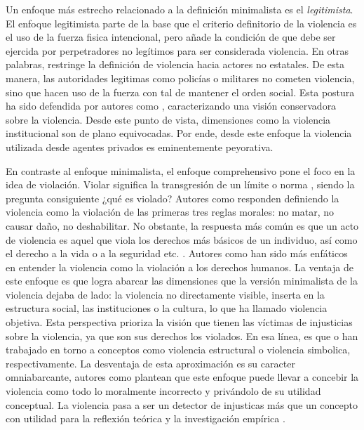 \documentclass[12pt,twoside]{templates/facsothesis}
\begin{document}
Un enfoque más estrecho relacionado a la definición minimalista es el \emph{legitimista}. El enfoque legitimista parte de la base que el criterio definitorio de la violencia es el uso de la fuerza fisica intencional, pero añade la condición de que debe ser ejercida por perpetradores no legítimos para ser considerada violencia. En otras palabras, restringe la definición de violencia hacia actores no estatales. De esta manera, las autoridades legitimas como policías o militares no cometen violencia, sino que hacen uso de la fuerza con tal de mantener el orden social. Esta postura ha sido defendida por autores como \citet{Hook1976}, caracterizando una visión conservadora sobre la violencia. Desde este punto de vista, dimensiones como la violencia institucional son de plano equivocadas. Por ende, desde este enfoque la violencia utilizada desde agentes privados es eminentemente peyorativa.

En contraste al enfoque minimalista, el enfoque comprehensivo pone el foco en la idea de violación. Violar significa la transgresión de un límite o norma \citep{Bufacchi2005, Bufacchi2007}, siendo la pregunta consiguiente ¿qué es violado? Autores como \citet{Gerd1969} responden definiendo la violencia como la violación de las primeras tres reglas morales: no matar, no causar daño, no deshabilitar. No obstante, la respuesta más común es que un acto de violencia es aquel que viola los derechos más básicos de un individuo, así como el derecho a la vida o a la seguridad etc. \citep{Copoeru2020}. Autores como \citet{Demirbas2019} han sido más enfáticos en entender la violencia como la violación a los derechos humanos. La ventaja de este enfoque es que logra abarcar las dimensiones que la versión minimalista de la violencia dejaba de lado: la violencia no directamente visible, inserta en la estructura social, las instituciones o la cultura, lo que \citet{Zizek2008} ha llamado violencia objetiva. Esta perspectiva prioriza la visión que tienen las víctimas de injusticias sobre la violencia, ya que son sus derechos los violados. En esa línea, es que \citet{Galtung1969} o \citet{Bourdieu1991} han trabajado en torno a conceptos como violencia estructural o violencia simbolica, respectivamente. La desventaja de esta aproximación es su caracter omniabarcante, autores como \citet{Bufacchi2005} plantean que este enfoque puede llevar a concebir la violencia como todo lo moralmente incorrecto y privándolo de su utilidad conceptual. La violencia pasa a ser un detector de injusticas más que un concepto con utilidad para la reflexión teórica y la investigación empírica \citep{Arostegui1994}.
\end{document}
